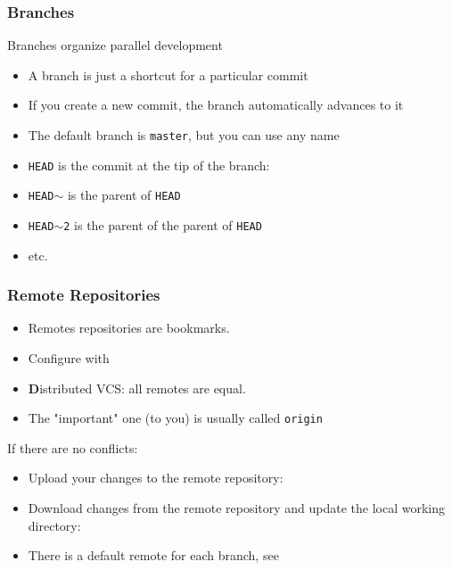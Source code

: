 \begin{frame}
  \frametitle{Branches}

  Branches organize parallel development
  \begin{itemize}
  \item A branch is just a shortcut for a particular commit
  \item If you create a new commit, the branch automatically advances
    to it
  \item The default branch is \texttt{master}, but you can use any name
  \item \texttt{HEAD} is the commit at the tip of the branch:\\
  \item \texttt{HEAD$\sim$} is the parent of \texttt{HEAD}
  \item \texttt{HEAD$\sim$2} is the parent of the parent of
    \texttt{HEAD}
  \item etc.
  \end{itemize}
\end{frame}


\begin{frame}
  \frametitle{Remote Repositories}
  
  \begin{itemize}
  \item Remotes repositories are bookmarks.
  \item Configure with 
  \item \textbf{D}istributed VCS: all remotes are equal.
  \item The "important" one (to you) is usually called \texttt{origin}
  \end{itemize}

  If there are no conflicts:
  \begin{itemize}
  \item Upload your changes to the remote repository:\\
  \item Download changes from the remote repository and update the
    local working directory:\\
  \item There is a default remote for each branch, see\\
  \end{itemize}

\end{frame}






